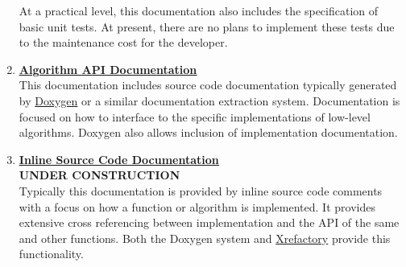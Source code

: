 \documentclass[12pt]{article}
\begin{document}
\begin{enumerate}
  At a practical level, this documentation also includes the
  specification of basic unit tests.  At present, there are no plans
  to implement these tests due to the maintenance cost for the
  developer.

\item \href{http://neurospaces.sourceforge.net/doxygen-menu.html}{\bf \underline{Algorithm API Documentation}}\\
  This documentation includes source code documentation typically
  generated by \href{http://www.stack.nl/~dimitri/doxygen/}{Doxygen}
  or a similar documentation extraction system.  Documentation is
  focused on how to interface to the specific implementations of
  low-level algorithms. Doxygen also allows inclusion of
  implementation documentation.

\item \href{../contents-level7/contents-level7.pdf}{\bf \underline{Inline Source Code Documentation}}\\
  {\bf UNDER CONSTRUCTION}\\
  Typically this documentation is provided by inline source code
  comments with a focus on how a function or algorithm is implemented.
  It provides extensive cross referencing between implementation and
  the API of the same and other functions.
  Both the Doxygen system and \href {http://www.xref.sk/xrefactory/main.html}{Xrefactory} provide this
  functionality.
  








\end{enumerate}
\end{document}
